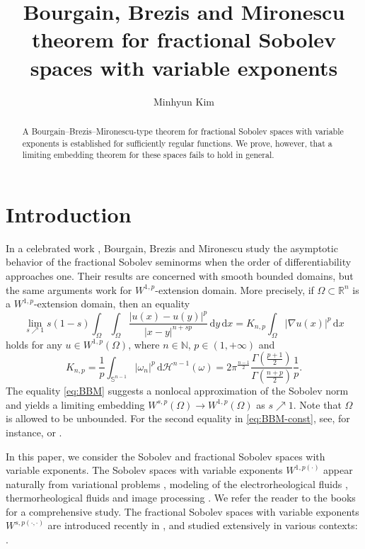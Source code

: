 \documentclass[11pt]{amsart}
\title[BBM theorem for fractional Sobolev spaces with variable exponents]{Bourgain, Brezis and Mironescu theorem for fractional Sobolev spaces with variable exponents}
\author{Minhyun Kim}
\theoremstyle{plain}
\theoremstyle{definition}
\numberwithin{equation}{section}
\begin{document}
\begin{abstract}
A Bourgain--Brezis--Mironescu-type theorem for fractional Sobolev spaces with variable exponents is established for sufficiently regular functions. We prove, however, that a limiting embedding theorem for these spaces fails to hold in general.
\end{abstract}

\maketitle


\section{Introduction} \label{sec:introduction}


In a celebrated work \cite{BBM01}, Bourgain, Brezis and Mironescu study the asymptotic behavior of the fractional Sobolev seminorms when the order of differentiability approaches one. Their results are concerned with smooth bounded domains, but the same arguments work for $W^{1, p}$-extension domain. More precisely, if $\Omega \subset \mathbb{R}^{n}$ is a $W^{1, p}$-extension domain, then an equality
\begin{equation} \label{eq:BBM}
\lim_{s \nearrow 1} s(1-s) \int_{\Omega} \int_{\Omega} \frac{|u(x)-u(y)|^{p}}{|x-y|^{n+sp}} \,\mathrm{d}y \,\mathrm{d}x = K_{n, p} \int_{\Omega} |\nabla u(x)|^{p} \,\mathrm{d}x
\end{equation}
holds for any $u \in W^{1, p}(\Omega)$, where $n \in \mathbb{N}$, $p \in (1, +\infty)$ and
\begin{equation} \label{eq:BBM-const}
K_{n, p} = \frac{1}{p} \int_{\mathbb{S}^{n-1}} |\omega_{n}|^{p} \,\mathrm{d}\mathcal{H}^{n-1}(\omega) = 2\pi^{\frac{n-1}{2}} \frac{\Gamma(\frac{p+1}{2})}{\Gamma(\frac{n+p}{2})} \frac{1}{p}.
\end{equation}
The equality \eqref{eq:BBM} suggests a nonlocal approximation of the Sobolev norm and yields a limiting embedding $W^{s, p}(\Omega) \to W^{1, p}(\Omega)$ as $s \nearrow 1$. Note that $\Omega$ is allowed to be unbounded. For the second equality in \eqref{eq:BBM-const}, see, for instance, \cite[Lemma 2.1]{IN10} or \cite[Proposition 3.9]{FG20}.

In this paper, we consider the Sobolev and fractional Sobolev spaces with variable exponents. The Sobolev spaces with variable exponents $W^{1, p(\cdot)}$ appear naturally from variational problems \cite{AM01,Alk97,CPC97,FZ99,Zhi97}, modeling of the electrorheological fluids \cite{RR96,RR01,Ruz00}, thermorheological fluids \cite{AR06} and image processing \cite{AMS08,BCE+09,CLR06,LLP10}. We refer the reader to the books \cite{CUF13,DHHR11} for a comprehensive study. The fractional Sobolev spaces with variable exponents $W^{s, p(\cdot, \cdot)}$ are introduced recently in \cite{KRV17}, and studied extensively in various contexts: \cite{ABS19,ABS20,BB19,Bah18,BR18,BRW20,BT21,CK21,DPR17,HKL21,HKS19,OK21}.
\end{document}
